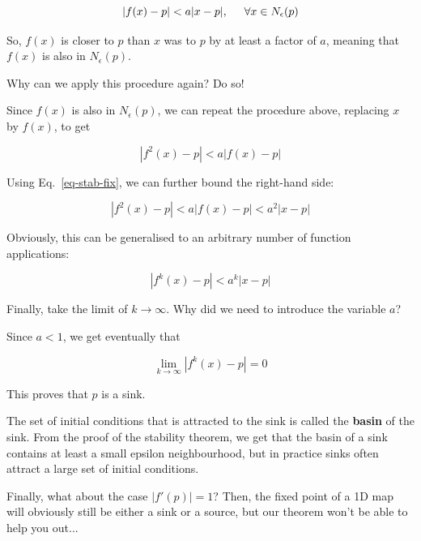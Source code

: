 \begin{equation}
\left|f(x)-p\right| < a |x-p|,  \hspace{.5cm} \forall x \in N_\epsilon(p) \label{eq-stab-fix}
\end{equation}

So, $f(x)$ is closer to $p$ than $x$ was to $p$ by at least a factor of $a$, meaning that $f(x)$ is also in $N_\epsilon(p)$.


\begin{cue}
Why can we apply this procedure again? Do so!  
\end{cue}

Since $f(x)$ is also in $N_\epsilon(p)$, we can repeat the procedure above, replacing $x$ by $f(x)$, to get

\begin{equation}
    \left|f^2(x)-p\right| < a\left|f(x)-p\right| 
\end{equation}  

Using Eq.~\ref{eq-stab-fix}, we can further bound the right-hand side:

\begin{equation}
    \left|f^2(x)-p\right| < a\left|f(x)-p\right| < a^2\left|x-p\right|
\end{equation}  

Obviously, this can be generalised to an arbitrary number of function applications:

\begin{equation}
\left|f^k(x)-p\right| < a^k |x-p| 
\end{equation}  

\begin{cue}
Finally, take the limit of $k \to \infty$. Why did we need to introduce the variable $a$?
\end{cue}

Since $a<1$, we get eventually that

\begin{equation}
\lim_{k \to \infty} \left|f^k(x)-p\right| = 0
\end{equation} 

This proves that $p$ is a sink.

The set of initial conditions that is attracted to the sink is called the \textbf{basin} of the sink. From the proof of the stability theorem, we get that the basin of a sink contains at least a small epsilon neighbourhood, but in practice sinks often attract a large set of initial conditions.

Finally, what about the case $|f'(p)|=1$? Then, the fixed point of a 1D map will obviously still be either a sink or a source, but our theorem won't be able to help you out...

